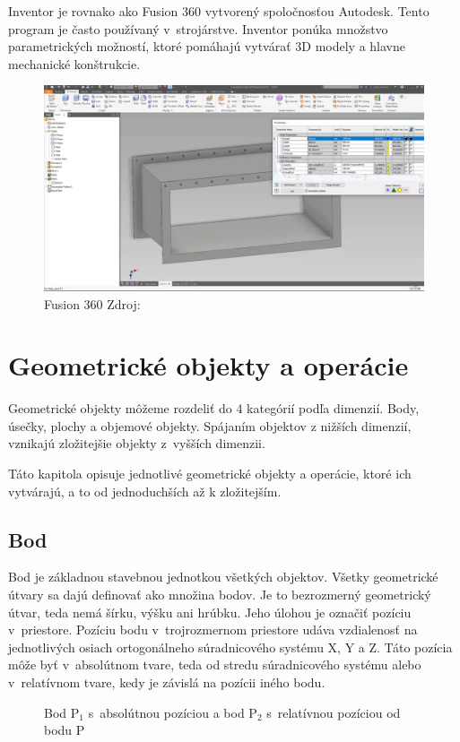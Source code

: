 Inventor je rovnako ako Fusion 360 vytvorený spoločnosťou Autodesk. Tento program je často používaný v~strojárstve. Inventor ponúka množstvo parametrických možností, ktoré pomáhajú vytvárať 3D modely a hlavne mechanické konštrukcie.


\begin{figure}[H]
    \centering
    \includegraphics[width = 0.5\linewidth]{obrazky-figures/programs/Inventor.png}
    \caption{Fusion 360 Zdroj: \cite{cadline_2017} }
    \label{fig:Inventor}
\end{figure}


\chapter{Geometrické objekty a operácie}
\label{chapt:Geometrické_tvary}

Geometrické objekty môžeme rozdeliť do 4 kategórií podľa dimenzií. Body, úsečky, plochy a objemové objekty.
Spájaním objektov z nižších dimenzií, vznikajú zložitejšie objekty z~vyšších dimenzii. 


Táto kapitola opisuje jednotlivé geometrické objekty a operácie, ktoré ich vytvárajú, a to od jednoduchších až k zložitejším.

\section{Bod}
Bod je základnou stavebnou jednotkou všetkých objektov. Všetky geometrické útvary sa dajú definovať ako množina bodov. Je to bezrozmerný geometrický útvar, teda nemá šírku, výšku ani hrúbku. Jeho úlohou je označiť pozíciu v~priestore. Pozíciu bodu v~trojrozmernom priestore udáva vzdialenosť na jednotlivých osiach ortogonálneho súradnicového systému X, Y a Z. Táto pozícia môže byť v~absolútnom tvare, teda od stredu súradnicového systému alebo v~relatívnom tvare, kedy je závislá na pozícii iného bodu.



\begin{figure}[H]
	\centering
	\caption{Bod P$_1$ s~absolútnou pozíciou a bod P$_2$ s~relatívnou pozíciou od bodu P}
	\label{fig:Point}
\end{figure}

